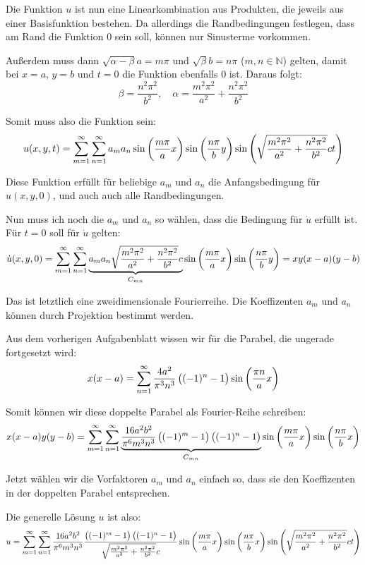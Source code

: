 \documentclass[11pt, ngerman, fleqn]{article}
\begin{document}
Die Funktion $u$ ist nun eine Linearkombination aus Produkten, die jeweils aus
einer Basisfunktion bestehen. Da allerdings die Randbedingungen festlegen, dass
am Rand die Funktion $0$ sein soll, können nur Sinusterme vorkommen.

Außerdem muss dann $\sqrt{\alpha - \beta} a = m \pi$ und $\sqrt{\beta} b = n \pi$ ($m,
n \in \mathbb N$) gelten, damit bei $x=a$, $y=b$ und $t=0$ die Funktion
ebenfalls $0$ ist. Daraus folgt:
\[
	\beta = \frac{n^2 \pi^2}{b^2}
	,\quad
	\alpha = \frac{m^2 \pi^2}{a^2} + \frac{n^2 \pi^2}{b^2}
\]

Somit muss also die Funktion sein:
\[
	u(x, y, t)
	= \sum_{m=1}^\infty \sum_{n=1}^\infty a_m a_n \sin\del{\frac{m\pi}a x}
	\sin\del{\frac{n\pi}b y}
	\sin\del{\sqrt{\frac{m^2\pi^2}{a^2} + \frac{n^2\pi^2}{b^2}} c t}
\]

Diese Funktion erfüllt für beliebige $a_m$ und $a_n$ die Anfangsbedingung
für $u(x, y, 0)$, und auch auch alle Randbedingungen.

Nun muss ich noch die $a_m$ und $a_n$ so wählen, dass die Bedingung für $\dot
u$ erfüllt ist. Für $t=0$ soll für $\dot u$ gelten:
\[
	\dot u(x, y, 0) =
	\sum_{m=1}^\infty \sum_{n=1}^\infty \underbrace{a_m a_n \sqrt{\frac{m^2\pi^2}{a^2} + \frac{n^2\pi^2}{b^2}} c}_{C_{mn}} \sin\del{\frac{m\pi}a x}
	\sin\del{\frac{n\pi}b y}
	= xy(x-a)(y-b)
\]

Das ist letztlich eine zweidimensionale Fourierreihe. Die Koeffizenten $a_m$
und $a_n$ können durch Projektion bestimmt werden.

Aus dem vorherigen Aufgabenblatt wissen wir für die Parabel, die ungerade fortgesetzt wird:
\[
	x(x-a) = \sum_{n=1}^\infty \frac{4a^2}{\pi^3 n^3} \del{(-1)^n -1} \sin\del{\frac{\pi n}a x}
\]

Somit können wir diese doppelte Parabel als Fourier-Reihe schreiben:
\[
	x(x-a)y(y-b)
	= \sum_{m=1}^\infty \sum_{n=1}^\infty \underbrace{\frac{16 a^2 b^2}{\pi^6 m^3 n^3} \del{(-1)^m -1} \del{(-1)^n -1}}_{C_{mn}} \sin\del{\frac{m \pi}{a} x} \sin\del{\frac{n \pi}{b} x}
\]

Jetzt wählen wir die Vorfaktoren $a_m$ und $a_n$ einfach so, dass sie den Koeffizenten in der doppelten Parabel entsprechen.

Die generelle Lösung $u$ ist also:
\[
	u =
	\sum_{m=1}^\infty \sum_{n=1}^\infty
	\frac{16 a^2 b^2}{\pi^6 m^3 n^3} \frac{ \del{(-1)^m -1} \del{(-1)^n -1}}
	{\sqrt{\frac{m^2\pi^2}{a^2} + \frac{n^2\pi^2}{b^2}} c}
	\sin\del{\frac{m \pi}{a} x} \sin\del{\frac{n \pi}{b} x}
	\sin\del{\sqrt{\frac{m^2\pi^2}{a^2} + \frac{n^2\pi^2}{b^2}} c t}
\]
\end{document}
